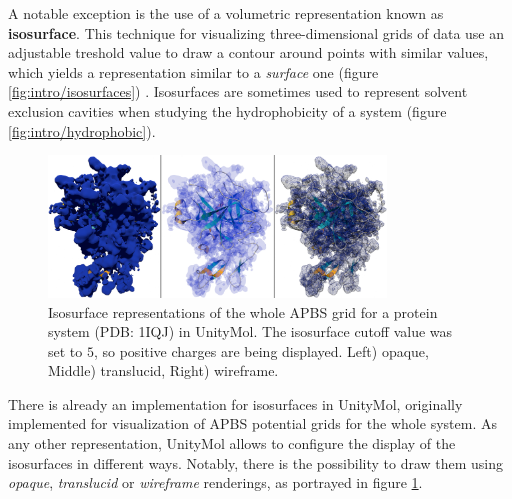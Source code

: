    A notable exception is the use of a volumetric representation known as \textbf{isosurface}. This technique for visualizing three-dimensional grids of data use an adjustable treshold value to draw a contour around points with similar values, which yields a representation similar to a \textit{surface} one (figure \ref{fig:intro/isosurfaces}) \cite{isosurfaces_web}. Isosurfaces are sometimes used to represent solvent exclusion cavities when studying the hydrophobicity of a system (figure \ref{fig:intro/hydrophobic}).

    \begin{figure}[H]
      \centering
      \includegraphics[width=0.8\textwidth]{figures/intro/isosurfaces_umol.png}
      \caption{\label{fig:intro/isosurfaces_umol} Isosurface representations of the whole APBS grid for a protein system (PDB: 1IQJ) in UnityMol. The isosurface cutoff value was set to $5$, so positive charges are being displayed. Left) opaque, Middle) translucid, Right) wireframe.}
    \end{figure}

    There is already an implementation for isosurfaces in UnityMol, originally implemented for visualization of APBS potential grids for the whole system. As any other representation, UnityMol allows to configure the display of the isosurfaces in different ways. Notably, there is the possibility to draw them using \textit{opaque}, \textit{translucid} or \textit{wireframe} renderings, as portrayed in figure \ref{fig:intro/isosurfaces_umol}.



